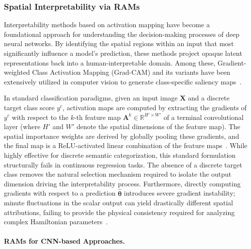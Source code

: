\documentclass[letterpaper, 12, one column]{article}
\begin{document}
\subsubsection{Spatial Interpretability via RAMs}\label{sec:rams}

Interpretability methods based on activation mapping have become a foundational approach for understanding the decision-making processes of deep neural networks. By identifying the spatial regions within an input that most significantly influence a model's prediction, these methods project opaque latent representations back into a human-interpretable domain. Among these, Gradient-weighted Class Activation Mapping (Grad-CAM) and its variants have been extensively utilized in computer vision to generate class-specific saliency maps~\cite{vinogradova2020gradcam}. 

In standard classification paradigms, given an input image $\mathbf{X}$ and a discrete target class score $y^c$, activation maps are computed by extracting the gradients of $y^c$ with respect to the $k$-th feature map $\mathbf{A}^k \in \mathbb{R}^{H' \times W'}$ of a terminal convolutional layer (where $H'$ and $W'$ denote the spatial dimensions of the feature map). The spatial importance weights are derived by globally pooling these gradients, and the final map is a ReLU-activated linear combination of the feature maps~\cite{zhang2024gradcam}. While highly effective for discrete semantic categorization, this standard formulation structurally fails in continuous regression tasks. The absence of a discrete target class removes the natural selection mechanism required to isolate the output dimension driving the interpretability process. Furthermore, directly computing gradients with respect to a prediction $\hat{\boldsymbol{\theta}}$ introduces severe gradient instability; minute fluctuations in the scalar output can yield drastically different spatial attributions, failing to provide the physical consistency required for analyzing complex Hamiltonian parameters~\cite{makke2024symbolic}.

\paragraph{RAMs for CNN-based Approaches.}\label{sec:CNN_RAMs}
\end{document}

